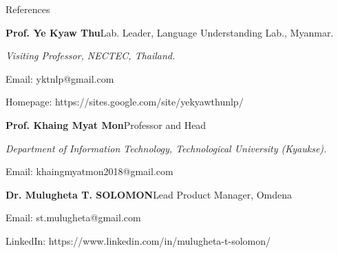 \documentclass{resume} %
\newcommand{\italicitem}[1]{\item{\textit{#1}}}
\begin{document}
\begin{rSection}{References}

\begin{rSubsectionNoBullet}{\bf Prof. Ye Kyaw Thu}{}{Lab. Leader, Language Understanding Lab., Myanmar.}{}
\italicitem{Visiting Professor, NECTEC, Thailand.}
\item{Email: yktnlp@gmail.com}         
\item{Homepage: https://sites.google.com/site/yekyawthunlp/}
\end{rSubsectionNoBullet}

\begin{rSubsectionNoBullet}{\bf Prof. Khaing Myat Mon}{}{Professor and Head}{}
\italicitem{Department of Information Technology, Technological University (Kyaukse).}
\item{Email: khaingmyatmon2018@gmail.com}
\end{rSubsectionNoBullet}

\begin{rSubsectionNoBullet}{\bf Dr. Mulugheta T. SOLOMON}{}{Lead Product Manager, Omdena}{}
\item{Email: st.mulugheta@gmail.com}         
\item{LinkedIn: https://www.linkedin.com/in/mulugheta-t-solomon/}
\end{rSubsectionNoBullet}

\end{rSection}
\end{document}
